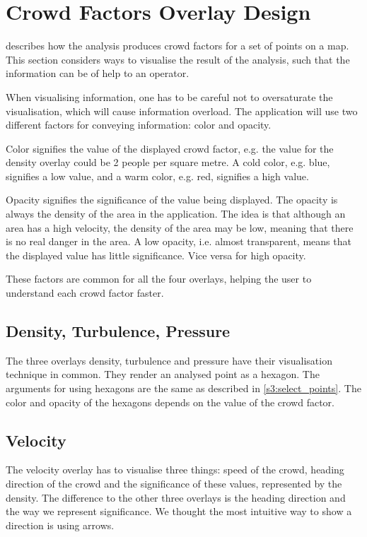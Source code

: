\section{Crowd Factors Overlay Design} \label{sec:s4_overlay}

 describes how the analysis produces crowd factors for a set of points on a map. This section considers ways to visualise the result of the analysis, such that the information can be of help to an operator.

When visualising information, one has to be careful not to oversaturate the visualisation, which will cause information overload. The application will use two different factors for conveying information: color and opacity.

Color signifies the value of the displayed crowd factor, e.g. the value for the density overlay could be 2 people per square metre. A cold color, e.g. blue, signifies a low value, and a warm color, e.g. red, signifies a high value. 

Opacity signifies the significance of the value being displayed. The opacity is always the density of the area in the application. The idea is that although an area has a high velocity, the density of the area may be low, meaning that there is no real danger in the area. A low opacity, i.e. almost transparent, means that the displayed value has little significance. Vice versa for high opacity. 

These factors are common for all the four overlays, helping the user to understand each crowd factor faster.

\subsection{Density, Turbulence, Pressure}
The three overlays density, turbulence and pressure have their visualisation technique in common. They render an analysed point as a hexagon. The arguments for using hexagons are the same as described in \cref{s3:select_points}. The color and opacity of the hexagons depends on the value of the crowd factor.

\subsection{Velocity}
The velocity overlay has to visualise three things: speed of the crowd, heading direction of the crowd and the significance of these values, represented by the density. The difference to the other three overlays is the heading direction and the way we represent significance. We thought the most intuitive way to show a direction is using arrows. 

